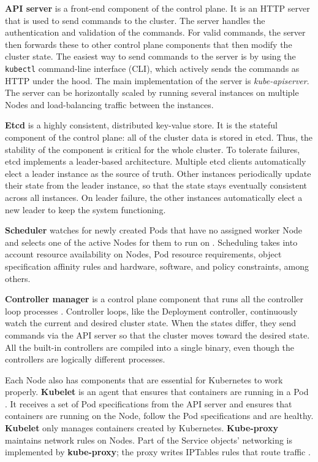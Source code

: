 \documentclass[english, 12pt, a4paper, sci, utf8, a-2b, online]{aaltothesis}
\begin{document}
\textbf{API server} is a front-end component of the control plane.
It is an HTTP server that is used to send commands to the cluster.
The server handles the authentication and validation of the commands.
For valid commands, the server then forwards these to other control plane components that then modify the cluster state.
The easiest way to send commands to the server is by using the \lstinline{kubectl} command-line interface (CLI), which actively sends the commands as HTTP under the hood.
The main implementation of the server is \emph{kube-apiserver}.
The server can be horizontally scaled by running several instances on multiple Nodes and load-balancing traffic between the instances.

\textbf{Etcd} \cite{etcd} is a highly consistent, distributed key-value store.
It is the stateful component of the control plane: all of the cluster data is stored in etcd.
Thus, the stability of the component is critical for the whole cluster.
To tolerate failures, etcd implements a leader-based architecture.
Multiple etcd clients automatically elect a leader instance as the source of truth.
Other instances periodically update their state from the leader instance, so that the state stays eventually consistent across all instances.
On leader failure, the other instances automatically elect a new leader to keep the system functioning.

\textbf{Scheduler} watches for newly created Pods that have no assigned worker Node and selects one of the active Nodes for them to run on \cite{k8s-docs-control-plane}.
Scheduling takes into account resource availability on Nodes, Pod resource requirements, object specification affinity rules and hardware, software, and policy constraints, among others.

\textbf{Controller manager} is a control plane component that runs all the controller loop processes \cite{k8s-docs-control-plane}.
Controller loops, like the Deployment controller, continuously watch the current and desired cluster state.
When the states differ, they send commands via the API server so that the cluster moves toward the desired state.
All the built-in controllers are compiled into a single binary, even though the controllers are logically different processes.

Each Node also has components that are essential for Kubernetes to work properly.
\textbf{Kubelet} is an agent that ensures that containers are running in a Pod \cite{k8s-docs-control-plane}.
It receives a set of Pod specifications from the API server and ensures that containers are running on the Node, follow the Pod specifications and are healthy.
\textbf{Kubelet} only manages containers created by Kubernetes.
\textbf{Kube-proxy} maintains network rules on Nodes.
Part of the Service objects' networking is implemented by \textbf{kube-proxy}; the proxy writes IPTables rules that route traffic \cite{cilium-proxy-free}.
\end{document}
